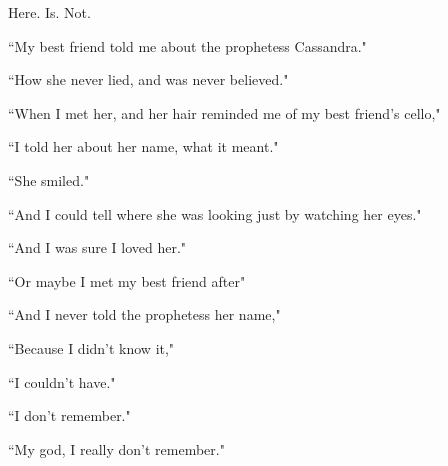 \documentclass[11pt]{article}
\begin{document}
\begingroup
\begin{center}
Here. Is. Not.
\rightskip\leftskip
\end{center}
\endgroup

\vspace*{4\baselineskip}

\begingroup
\begin{center}
``My best friend told me about the prophetess Cassandra."
\end{center}
\endgroup

\begingroup
\begin{center}
``How she never lied, and was never believed."
\end{center}
\endgroup

\begingroup
\begin{center}
``When I met her, and her hair reminded me of my best friend's cello,"
\end{center}
\endgroup

\begingroup
\begin{center}
``I told her about her name, what it meant."
\end{center}
\endgroup

\begingroup
\begin{center}
``She smiled."
\end{center}
\endgroup

\begingroup
\begin{center}
``And I could tell where she was looking just by watching her eyes."
\end{center}
\endgroup

\begingroup
\begin{center}
``And I was sure I loved her."
\end{center}
\endgroup

\begingroup
\begin{center}
``Or maybe I met my best friend after"
\end{center}
\endgroup

\begingroup
\begin{center}
``And I never told the prophetess her name,"
\end{center}
\endgroup

\begingroup
\begin{center}
``Because I didn't know it,"
\end{center}
\endgroup

\begingroup
\begin{center}
``I couldn't have."
\end{center}
\endgroup

\begingroup
\begin{center}
``I don't remember."
\end{center}
\endgroup

\begingroup
\begin{center}
``My god, I really don't remember."
\end{center}
\endgroup
\end{document}
